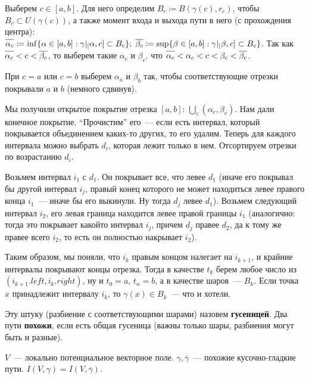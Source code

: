 \begin{Proof}
	\newcommand{\acl}{\overline{\vphantom{\beta}\alpha_c}}
	\newcommand{\bcl}{\overline{\beta_c}}
	Выберем $c\in[a,b]$. Для него определим $B_c\coloneqq B(\gamma(c), r_c)$, чтобы $B_c\subset U(\gamma(c))$, а также момент входа и выхода пути в него (с прохождения центра):\\ $\acl\coloneqq\inf\{\alpha\in[a,b]:\gamma|_[\alpha,c]\subset B_c\};\;\bcl\coloneqq\sup\{\beta\in[a,b]:\gamma|_[\beta,c]\subset B_c\}$. Так как $\acl<c<\bcl$, то выберем такие $\alpha_c$ и $\beta_c$, что $\acl<\alpha_c<c<\beta_c<\bcl$.

	При $c=a$ или $c=b$ выберем $\alpha_a$ и $\beta_b$ так, чтобы соответствующие отрезки покрывали $a$ и $b$ (немного сдвинув).
	
	Мы получили открытое покрытие отрезка $[a,b]$: $\bigcup\limits_c (\alpha_c,\beta_c)$. Нам дали конечное покрытие. ``Прочистим'' его~--- если есть интервал, который покрывается объединением каких-то других, то его удалим. Теперь для каждого интервала можно выбрать $d_i$, которая лежит только в нем. Отсортируем отрезки по возрастанию $d_i$.
	
	Возьмем интервал $i_1$ с $d_1$. Он покрывает все, что левее $d_1$ (иначе его покрывал бы другой интервал $i_j$, правый конец которого не может находиться левее правого конца $i_1$~--- иначе бы его выкинули. Ну тогда $d_j$ левее $d_1$). Возьмем следующий интервал $i_2$, его левая граница находится левее правой границы $i_1$ (аналогично: тогда это покрывает какойто интервал $i_j$, причем $d_j$ правее $d_2$, да к тому же правее всего $i_2$, то есть он полностью накрывает $i_2$).
	
	Таким образом, мы поняли, что $i_k$ правым концом налегает на $i_{k+1}$, и крайние интервалы покрывают концы отрезка. Тогда в качестве $t_k$ берем любое число из $(i_{k+1}.left,i_k.right)$, ну и $t_0=a,\,t_n=b$, а в качестве шаров~--- $B_k$. Если точка $x$ принадлежит интервалу $i_k$, то $\gamma(x)\in B_k$~--- что и хотели.
\end{Proof}

\begin{defin*}
	Эту штуку (разбиение с соответствующими шарами) назовем \textbf{гусеницей}.
	Два пути \textbf{похожи}, если есть общая гусеница (важны только шары, разбиения могут быть и разные).
\end{defin*}

\begin{Theorem*}
	\newcommand{\gammap}{\overline{\gamma}}
	$V$~--- локально потенциальное векторное поле. $\gamma,\gammap$~--- похожие кусочно-гладкие пути. \THEN $I(V,\gamma)=I(V,\gammap)$.
\end{Theorem*}

